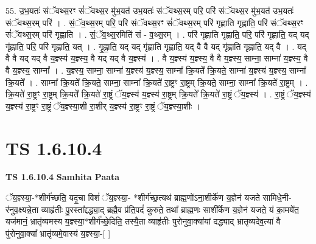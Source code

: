 \documentclass[17pt]{extarticle}
\begin{document}
55. उ॒भ॒यतः॑ संॅवथ्स॒रꣳ सं॑ॅवथ्स॒र मु॑भ॒यत॑ उभ॒यतः॑ संॅवथ्स॒रम् परि॒ परि॑ संॅवथ्स॒र मु॑भ॒यत॑ उभ॒यतः॑ संॅवथ्स॒रम् परि॑ । . सं॒ॅव॒थ्स॒रम् परि॒ परि॑ संॅवथ्स॒रꣳ सं॑ॅवथ्स॒रम् परि॑ गृह्णाति गृह्णाति॒ परि॑ संॅवथ्स॒रꣳ सं॑ॅवथ्स॒रम् परि॑ गृह्णाति । . सं॒ॅव॒थ्स॒रमिति॑ सं - व॒थ्स॒रम् । . परि॑ गृह्णाति गृह्णाति॒ परि॒ परि॑ गृह्णाति॒ यद् यद् गृ॑ह्णाति॒ परि॒ परि॑ गृह्णाति॒ यत् । . गृ॒ह्णा॒ति॒ यद् यद् गृ॑ह्णाति गृह्णाति॒ यद् वै वै यद् गृ॑ह्णाति गृह्णाति॒ यद् वै । . यद् वै वै यद् यद् वै य॒ज्ञ्स्य॑ य॒ज्ञ्स्य॒ वै यद् यद् वै य॒ज्ञ्स्य॑ । . वै य॒ज्ञ्स्य॑ य॒ज्ञ्स्य॒ वै वै य॒ज्ञ्स्य॒ साम्ना॒ साम्ना॑ य॒ज्ञ्स्य॒ वै वै य॒ज्ञ्स्य॒ साम्ना᳚ । . य॒ज्ञ्स्य॒ साम्ना॒ साम्ना॑ य॒ज्ञ्स्य॑ य॒ज्ञ्स्य॒ साम्ना᳚ क्रि॒यते᳚ क्रि॒यते॒ साम्ना॑ य॒ज्ञ्स्य॑ य॒ज्ञ्स्य॒ साम्ना᳚ क्रि॒यते᳚ । . साम्ना᳚ क्रि॒यते᳚ क्रि॒यते॒ साम्ना॒ साम्ना᳚ क्रि॒यते॑ रा॒ष्ट्रꣳ रा॒ष्ट्रम् क्रि॒यते॒ साम्ना॒ साम्ना᳚ क्रि॒यते॑ रा॒ष्ट्रम् । . क्रि॒यते॑ रा॒ष्ट्रꣳ रा॒ष्ट्रम् क्रि॒यते᳚ क्रि॒यते॑ रा॒ष्ट्रं ॅय॒ज्ञ्स्य॑ य॒ज्ञ्स्य॑ रा॒ष्ट्रम् क्रि॒यते᳚ क्रि॒यते॑ रा॒ष्ट्रं ॅय॒ज्ञ्स्य॑ । . रा॒ष्ट्रं ॅय॒ज्ञ्स्य॑ य॒ज्ञ्स्य॑ रा॒ष्ट्रꣳ रा॒ष्ट्रं ॅय॒ज्ञ्स्या॒शी रा॒शीर् य॒ज्ञ्स्य॑ रा॒ष्ट्रꣳ रा॒ष्ट्रं ॅय॒ज्ञ्स्या॒शीः । \newline
\pagebreak
{}

\section{ TS 1.6.10.4 }

\textbf{TS 1.6.10.4 } \newline
\textbf{Samhita Paata} \newline

ॅय॒ज्ञ्स्या॒-*शीर्ग॑च्छति॒ यदृ॒चा विशं॑ ॅय॒ज्ञ्स्या॒- *शीर्ग॑च्छ॒त्यथ॑ ब्राह्म॒णो॑ऽना॒शीर्के॑ण य॒ज्ञेन॑ यजते सामिधे॒नी-र॑नुव॒क्ष्यन्ने॒ता व्याहृ॑तीः पु॒रस्ता᳚द्दद्ध्या॒द् ब्रह्मै॒व प्र॑ति॒पदं॑ कुरुते॒ तथा᳚ ब्राह्म॒णः साशी᳚र्केण य॒ज्ञेन॑ यजते॒ यं का॒मये॑त॒ यज॑मानं॒ भ्रातृ॑व्यमस्य य॒ज्ञ्स्या॒*शीर्ग॑च्छे॒दिति॒ तस्यै॒ता व्याहृ॑तीः पुरोनुवा॒क्या॑यां दद्ध्याद् भ्रातृव्यदेव॒त्या॑ वै पु॑रोनुवा॒क्या᳚ भ्रातृ॑व्यमे॒वास्य॑ य॒ज्ञ्स्या॒-[ ] \newline
\end{document}
